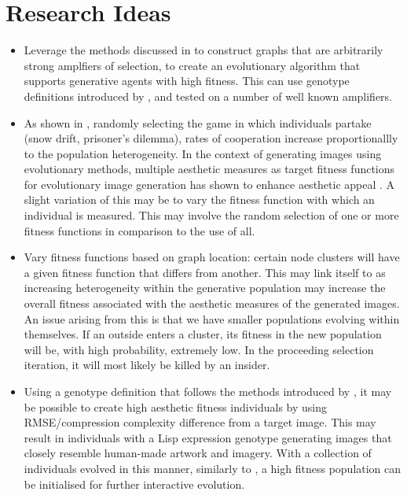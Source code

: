 \documentclass[10pt,a4paper]{article}
\begin{document}
\section{Research Ideas}
\begin{itemize}
	\item Leverage the methods discussed in \cite{graph-amplifiers} to construct graphs that are arbitrarily strong amplfiers of selection, to create an evolutionary algorithm that supports generative agents with high fitness.
	This can use genotype definitions introduced by \cite{sims}, and tested on a number of well known amplifiers.
	
	\item As shown in \cite{mixed-games}, randomly selecting the game in which individuals partake (snow drift, prisoner's dilemma), rates of cooperation increase proportionallly to the population heterogeneity.
	In the context of generating images using evolutionary methods, multiple aesthetic measures as target fitness functions for evolutionary image generation has shown to enhance aesthetic appeal \cite{aesthetic-measures}.
	A slight variation of this may be to vary the fitness function with which an individual is measured.
	This may involve the random selection of one or more fitness functions in comparison to the use of all.
	
	\item Vary fitness functions based on graph location: certain node clusters will have a given fitness function that differs from another.
	This may link itself to \cite{mixed-games} as increasing heterogeneity within the generative population may increase the overall fitness associated with the aesthetic measures of the generated images.
	An issue arising from this is that we have smaller populations evolving within themselves.
	If an outside enters a cluster, its fitness in the new population will be, with high probability, extremely low.
	In the proceeding selection iteration, it will most likely be killed by an insider.
	
	\item Using a genotype definition that follows the methods introduced by \cite{sims}, it may be possible to create high aesthetic fitness individuals by using RMSE/compression complexity difference from a target image. 
	This may result in individuals with a Lisp expression genotype generating images that closely resemble human-made artwork and imagery.
	With a collection of individuals evolved in this manner, similarly to \cite{nevar}, a high fitness population can be initialised for further interactive evolution.
	

\end{itemize}
\end{document}
